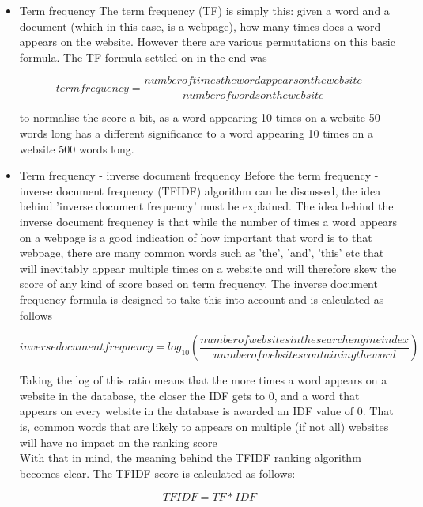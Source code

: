 \begin{itemize}

\item Term frequency
The term frequency (TF) is simply this: given a word and a document (which in this case, is a webpage), how many times does a word appears on the website.
However there are various permutations on this basic formula.
The TF formula settled on in the end was

\begin{equation*}
    term frequency = \frac{number of times the word appears on the website}{number of words on the website}
\end{equation*}

to normalise the score a bit, as a word appearing 10 times on a website 50 words long has a different significance to a word appearing 10 times on a website 500 words long.

\item Term frequency - inverse document frequency
Before the term frequency - inverse document frequency (TFIDF) algorithm can be discussed, the idea behind 'inverse document frequency' must be explained.
The idea behind the inverse document frequency is that while the number of times a word appears on a webpage is a good indication of how important that
word is to that webpage, there are many common words such as 'the', 'and', 'this' etc that will inevitably appear multiple times on a website and will
therefore skew the score of any kind of score based on term frequency.
The inverse document frequency formula is designed to take this into account and is calculated as follows

\begin{equation*}
    inverse document frequency = log_{10}(\frac{number of websites in the search engine index}{number of websites containing the word})
\end{equation*}

Taking the log of this ratio means that the more times a word appears on a website in the database, the closer the IDF gets to 0, and a word that appears on every website
in the database is awarded an IDF value of 0.
That is, common words that are likely to appears on multiple (if not all) websites will have no impact on the ranking score
\\
With that in mind, the meaning behind the TFIDF ranking algorithm becomes clear.
The TFIDF score is calculated as follows:

\begin{equation*}
    TFIDF = TF * IDF
\end{equation*}


\end{itemize}
